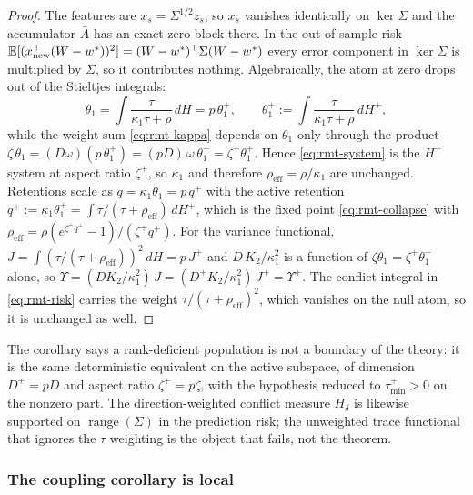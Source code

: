\begin{proof}
The features are $x_s = \Sigma^{1/2} z_s$, so $x_s$ vanishes identically on $\ker\Sigma$ and the accumulator $\bar A$ has an exact zero block there.
In the out-of-sample risk $\mathbb{E}[(x_{\mathrm{new}}^\top(W-w^*))^2] = (W-w^*)^\top\Sigma(W-w^*)$ every error component in $\ker\Sigma$ is multiplied by $\Sigma$, so it contributes nothing.
Algebraically, the atom at zero drops out of the Stieltjes integrals:
\[
\theta_1 = \int \frac{\tau}{\kappa_1\tau+\rho}\,dH = p\,\theta_1^+,
\qquad \theta_1^+ := \int \frac{\tau}{\kappa_1\tau+\rho}\,dH^+,
\]
while the weight sum \eqref{eq:rmt-kappa} depends on $\theta_1$ only through the product
$\zeta\,\theta_1 = (D\omega)(p\,\theta_1^+) = (pD)\,\omega\,\theta_1^+ = \zeta^+ \theta_1^+$.
Hence \eqref{eq:rmt-system} is the $H^+$ system at aspect ratio $\zeta^+$, so $\kappa_1$ and therefore $\rho_{\mathrm{eff}} = \rho/\kappa_1$ are unchanged.
Retentions scale as $q = \kappa_1\theta_1 = p\,q^+$ with the active retention $q^+ := \kappa_1\theta_1^+ = \int \tau/(\tau+\rho_{\mathrm{eff}})\,dH^+$, which is the fixed point \eqref{eq:rmt-collapse} with $\rho_{\mathrm{eff}} = \rho (e^{\zeta^+ q^+}-1)/(\zeta^+ q^+)$.
For the variance functional, $J = \int (\tau/(\tau+\rho_{\mathrm{eff}}))^2\,dH = p\,J^+$ and $D\,K_2/\kappa_1^2$ is a function of $\zeta\theta_1 = \zeta^+\theta_1^+$ alone, so
$\Upsilon = (D K_2/\kappa_1^2)\,J = (D^+ K_2/\kappa_1^2)\,J^+ = \Upsilon^+$.
The conflict integral in \eqref{eq:rmt-risk} carries the weight $\tau/(\tau+\rho_{\mathrm{eff}})^2$, which vanishes on the null atom, so it is unchanged as well.
\end{proof}

The corollary says a rank-deficient population is not a boundary of the theory: it is the same deterministic equivalent on the active subspace, of dimension $D^+ = pD$ and aspect ratio $\zeta^+ = p\zeta$, with the hypothesis reduced to $\tau_{\min}^+ > 0$ on the nonzero part.
The direction-weighted conflict measure $H_\delta$ is likewise supported on $\operatorname{range}(\Sigma)$ in the prediction risk; the unweighted trace functional that ignores the $\tau$ weighting is the object that fails, not the theorem.

\subsubsection{The coupling corollary is local}
\label{app:rmt-coupling}

